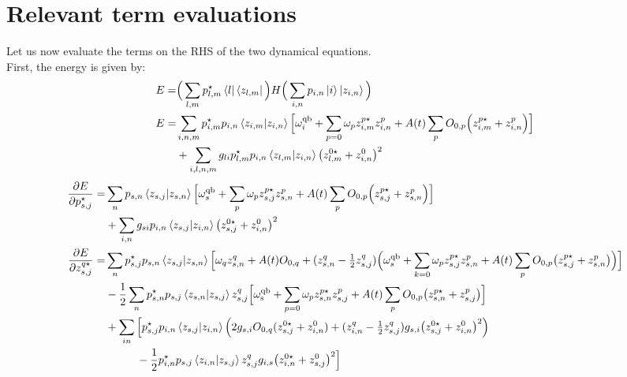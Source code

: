 \documentclass[prb]{revtex4}
\newcommand{\eq}[1]{\begin{align}#1\end{align}}
\begin{document}
\section{Relevant term evaluations}

Let us now evaluate the terms on the RHS of the two dynamical equations. \\

First, the energy is given by:
\eq{	
E =& \Big(  \sum_{l,m} p_{l,m}^\star \bra{l} \bra{z_{l,m}}\Big) H \Big(  \sum_{i,n} p_{i,n}\ket{i} \ket{z_{i,n}}\Big)  \notag \\
E=& \sum_{i,n,m}  p_{i,m}^{\star} p_{i,n}  \braket{ z_{i,m} | z_{i,n} } \Bigl[\omega^{\rm qb}_i  +\sum_{p=0} \omega_p z_{i,m}^{p\star} z_{i,n}^p + A(t)\sum_{p} O_{0,p}\Big( z_{i,m}^{p\star} +z_{i,n}^{p}  \Big)   \Bigr]  \notag \\
&+  \sum_{i,l,n,m}  g_{li}  p_{l,m}^{\star} p_{i,n}  \braket{ z_{l,m} | z_{i,n} } \big( z_{l,m}^{0\star} + z_{i,n}^{0}  \big)^2
}
%
\eq{	
\frac{\partial E}{\partial p_{s,j}^\star} =& \sum_{n}   p_{s,n} \braket{ z_{s,j} | z_{s,n} } \Bigl[ \omega^{\rm qb}_s  +  \sum_p \omega_p z_{s,j}^{p\star} z_{s,n}^p  + A(t)\sum_{p} O_{0,p}\Big( z_{s,j}^{p\star} + z_{s,n}^{p}  \Big) \Bigr] \\ 
&+  \sum_{i,n}  g_{si}  p_{i,n}  \braket{ z_{s,j} | z_{i,n} } \big( z_{s,j}^{0\star} + z_{i,n}^0 \big)^2
\\
%
\frac{\partial E}{\partial z_{s,j}^{q\star}} =&\sum_{n}   p_{s,j}^\star p_{s,n} \braket{ z_{s,j} | z_{s,n} }  \Bigl[ \omega_q z_{s,n}^{q} 
+ A(t) O_{0,q} +( z_{s,n}^{q} - \tfrac{1}{2}z_{s,j}^{q} ) \Big(\omega_s^{\rm qb} + \sum_{k=0} \omega_p z_{s,j}^{p\star} z_{s,n}^p + A(t)\sum_{p} O_{0,p}\big(z_{s,j}^{p\star} + z_{s,n}^{p}\big) \Big) \Big] \notag \\
& - \frac{1}{2} \sum_n p_{s,n}^\star p_{s,j}  \braket{z_{s,n}|z_{s,j}} z_{s,j}^{q} \Big[  \omega_{\rm s}^{\rm qb} + \sum_{p=0}  \omega_p z_{s,n}^{p\star} z_{s,j}^p + A(t)\sum_{p} O_{0,p}\big(z_{s,n}^{p\star} + z_{s,j}^{p}\big)  \Big] \notag\\
&+\sum_{in} \Big[  p_{s,j}^\star p_{i,n} \braket{z_{s,j} |z_{i,n} } \Big(2 g_{s,i}O_{0,q}(z_{s,j}^{0 \star} +z_{i,n}^{0} ) + (z_{i,n}^{q} - \tfrac{1}{2}z_{s,j}^{q}) g_{s,i}  \big( z_{s,j}^{0\star} + z_{i,n}^{0}  \big)^2  \Big) \\
& \hspace{1cm}- \frac{1}{2}p_{i,n}^\star p_{s,j}  \braket{z_{i,n}|z_{s,j}} z_{s,j}^{q}  g_{i,s} \big( z_{i,n}^{0\star} + z_{s,j}^{0} \big)^2 \Big] 
}
\end{document}
